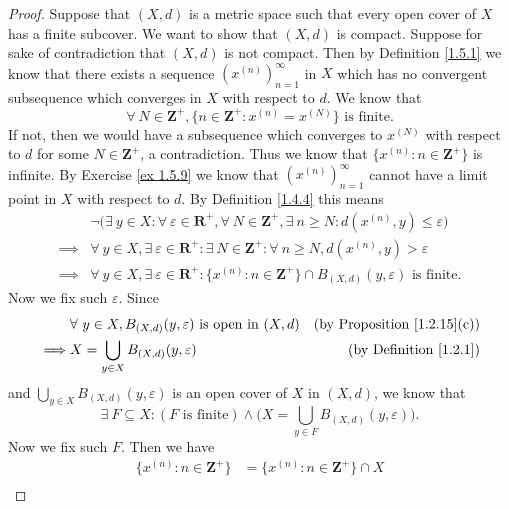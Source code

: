 \begin{proof}
    Suppose that \((X, d)\) is a metric space such that every open cover of \(X\) has a finite subcover.
    We want to show that \((X, d)\) is compact.
    Suppose for sake of contradiction that \((X, d)\) is not compact.
    Then by Definition \ref{1.5.1} we know that there exists a sequence \((x^{(n)})_{n = 1}^\infty\) in \(X\) which has no convergent subsequence which converges in \(X\) with respect to \(d\).
    We know that
    \[
        \forall\ N \in \mathbf{Z}^+, \big\{n \in \mathbf{Z}^+ : x^{(n)} = x^{(N)}\big\} \text{ is finite}.
    \]
    If not, then we would have a subsequence which converges to \(x^{(N)}\) with respect to \(d\) for some \(N \in \mathbf{Z}^+\), a contradiction.
    Thus we know that \(\big\{x^{(n)} : n \in \mathbf{Z}^+\big\}\) is infinite.
    By Exercise \ref{ex 1.5.9} we know that \((x^{(n)})_{n = 1}^\infty\) cannot have a limit point in \(X\) with respect to \(d\).
    By Definition \ref{1.4.4} this means
    \begin{align*}
                 & \lnot\big(\exists\ y \in X : \forall\ \varepsilon \in \mathbf{R}^+, \forall\ N \in \mathbf{Z}^+, \exists\ n \geq N : d(x^{(n)}, y) \leq \varepsilon\big) \\
        \implies & \forall\ y \in X, \exists\ \varepsilon \in \mathbf{R}^+ : \exists\ N \in \mathbf{Z}^+ : \forall\ n \geq N, d(x^{(n)}, y) > \varepsilon                   \\
        \implies & \forall\ y \in X, \exists\ \varepsilon \in \mathbf{R}^+ : \big\{x^{(n)} : n \in \mathbf{Z}^+\big\} \cap B_{(X, d)}(y, \varepsilon) \text{ is finite}.
    \end{align*}
    Now we fix such \(\varepsilon\).
    Since
    \begin{align*}
                 & \forall\ y \in X, B_{(X, d)}(y, \varepsilon) \text{ is open in } (X, d) & \text{(by Proposition \ref{1.2.15}(c))} \\
        \implies & X = \bigcup_{y \in X} B_{(X, d)}(y, \varepsilon)                        & \text{(by Definition \ref{1.2.1})}
    \end{align*}
    and \(\bigcup_{y \in X} B_{(X, d)}(y, \varepsilon)\) is an open cover of \(X\) in \((X, d)\), we know that
    \[
        \exists\ F \subseteq X : (F \text{ is finite}) \land \bigg(X = \bigcup_{y \in F} B_{(X, d)}(y, \varepsilon)\bigg).
    \]
    Now we fix such \(F\).
    Then we have
    \begin{align*}
        \{x^{(n)} : n \in \mathbf{Z}^+\} & = \{x^{(n)} : n \in \mathbf{Z}^+\} \cap X                                                        \\

\end{align*}
\end{proof}
